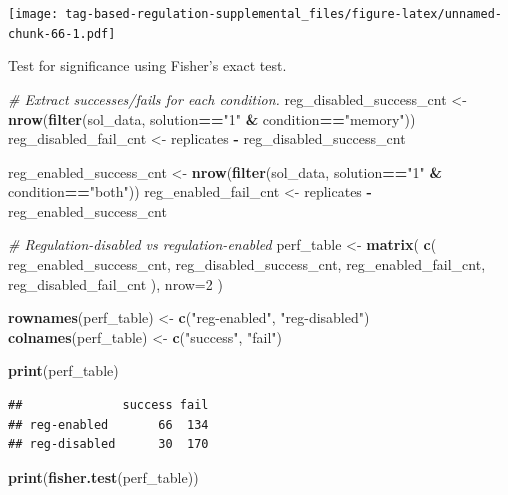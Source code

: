 \documentclass[]{book}
\newenvironment{Shaded}{\begin{snugshade}}{\end{snugshade}}
\newcommand{\CommentTok}[1]{\textcolor[rgb]{0.56,0.35,0.01}{\textit{#1}}}
\newcommand{\DataTypeTok}[1]{\textcolor[rgb]{0.13,0.29,0.53}{#1}}
\newcommand{\DecValTok}[1]{\textcolor[rgb]{0.00,0.00,0.81}{#1}}
\newcommand{\KeywordTok}[1]{\textcolor[rgb]{0.13,0.29,0.53}{\textbf{#1}}}
\newcommand{\NormalTok}[1]{#1}
\newcommand{\OperatorTok}[1]{\textcolor[rgb]{0.81,0.36,0.00}{\textbf{#1}}}
\newcommand{\StringTok}[1]{\textcolor[rgb]{0.31,0.60,0.02}{#1}}
\begin{document}
\texttt{[image: tag-based-regulation-supplemental\_files/figure-latex/unnamed-chunk-66-1.pdf]}

Test for significance using Fisher's exact test.

\begin{Shaded}
\begin{Highlighting}[]
\CommentTok{# Extract successes/fails for each condition.}
\NormalTok{reg_disabled_success_cnt <-}\StringTok{ }\KeywordTok{nrow}\NormalTok{(}\KeywordTok{filter}\NormalTok{(sol_data, solution}\OperatorTok{==}\StringTok{"1"} \OperatorTok{&}\StringTok{ }\NormalTok{condition}\OperatorTok{==}\StringTok{"memory"}\NormalTok{))}
\NormalTok{reg_disabled_fail_cnt <-}\StringTok{ }\NormalTok{replicates }\OperatorTok{-}\StringTok{ }\NormalTok{reg_disabled_success_cnt}

\NormalTok{reg_enabled_success_cnt <-}\StringTok{ }\KeywordTok{nrow}\NormalTok{(}\KeywordTok{filter}\NormalTok{(sol_data, solution}\OperatorTok{==}\StringTok{"1"} \OperatorTok{&}\StringTok{ }\NormalTok{condition}\OperatorTok{==}\StringTok{"both"}\NormalTok{))}
\NormalTok{reg_enabled_fail_cnt <-}\StringTok{ }\NormalTok{replicates }\OperatorTok{-}\StringTok{ }\NormalTok{reg_enabled_success_cnt}

\CommentTok{# Regulation-disabled vs regulation-enabled}
\NormalTok{perf_table <-}\StringTok{ }\KeywordTok{matrix}\NormalTok{(}
  \KeywordTok{c}\NormalTok{(}
\NormalTok{    reg_enabled_success_cnt,}
\NormalTok{    reg_disabled_success_cnt,}
\NormalTok{    reg_enabled_fail_cnt,}
\NormalTok{    reg_disabled_fail_cnt}
\NormalTok{    ),}
    \DataTypeTok{nrow=}\DecValTok{2}
\NormalTok{)}

\KeywordTok{rownames}\NormalTok{(perf_table) <-}\StringTok{ }\KeywordTok{c}\NormalTok{(}\StringTok{"reg-enabled"}\NormalTok{, }\StringTok{"reg-disabled"}\NormalTok{)}
\KeywordTok{colnames}\NormalTok{(perf_table) <-}\StringTok{ }\KeywordTok{c}\NormalTok{(}\StringTok{"success"}\NormalTok{, }\StringTok{"fail"}\NormalTok{)}

\KeywordTok{print}\NormalTok{(perf_table)}
\end{Highlighting}
\end{Shaded}

\begin{verbatim}
##              success fail
## reg-enabled       66  134
## reg-disabled      30  170
\end{verbatim}

\begin{Shaded}
\begin{Highlighting}[]
\KeywordTok{print}\NormalTok{(}\KeywordTok{fisher.test}\NormalTok{(perf_table))}
\end{Highlighting}
\end{Shaded}
\end{document}
